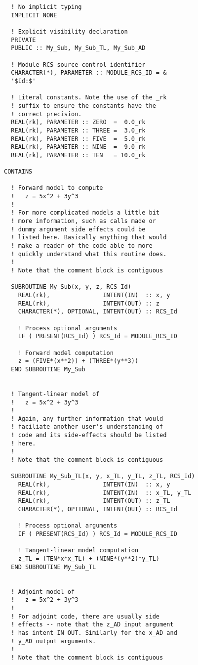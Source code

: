 \begin{appendix}
\begin{verbatim}
  ! No implicit typing
  IMPLICIT NONE

  ! Explicit visibility declaration
  PRIVATE
  PUBLIC :: My_Sub, My_Sub_TL, My_Sub_AD

  ! Module RCS source control identifier
  CHARACTER(*), PARAMETER :: MODULE_RCS_ID = &
  '$Id:$'

  ! Literal constants. Note the use of the _rk
  ! suffix to ensure the constants have the
  ! correct precision.
  REAL(rk), PARAMETER :: ZERO  =  0.0_rk
  REAL(rk), PARAMETER :: THREE =  3.0_rk
  REAL(rk), PARAMETER :: FIVE  =  5.0_rk
  REAL(rk), PARAMETER :: NINE  =  9.0_rk
  REAL(rk), PARAMETER :: TEN   = 10.0_rk

CONTAINS

  ! Forward model to compute
  !   z = 5x^2 + 3y^3
  !
  ! For more complicated models a little bit
  ! more information, such as calls made or
  ! dummy argument side effects could be 
  ! listed here. Basically anything that would
  ! make a reader of the code able to more
  ! quickly understand what this routine does.
  !
  ! Note that the comment block is contiguous

  SUBROUTINE My_Sub(x, y, z, RCS_Id)
    REAL(rk),               INTENT(IN)  :: x, y
    REAL(rk),               INTENT(OUT) :: z
    CHARACTER(*), OPTIONAL, INTENT(OUT) :: RCS_Id

    ! Process optional arguments
    IF ( PRESENT(RCS_Id) ) RCS_Id = MODULE_RCS_ID

    ! Forward model computation
    z = (FIVE*(x**2)) + (THREE*(y**3))
  END SUBROUTINE My_Sub


  ! Tangent-linear model of
  !   z = 5x^2 + 3y^3
  !
  ! Again, any further information that would
  ! faciliate another user's understanding of
  ! code and its side-effects should be listed
  ! here.
  !
  ! Note that the comment block is contiguous

  SUBROUTINE My_Sub_TL(x, y, x_TL, y_TL, z_TL, RCS_Id)
    REAL(rk),               INTENT(IN)  :: x, y
    REAL(rk),               INTENT(IN)  :: x_TL, y_TL
    REAL(rk),               INTENT(OUT) :: z_TL
    CHARACTER(*), OPTIONAL, INTENT(OUT) :: RCS_Id

    ! Process optional arguments
    IF ( PRESENT(RCS_Id) ) RCS_Id = MODULE_RCS_ID

    ! Tangent-linear model computation
    z_TL = (TEN*x*x_TL) + (NINE*(y**2)*y_TL)
  END SUBROUTINE My_Sub_TL


  ! Adjoint model of
  !   z = 5x^2 + 3y^3
  !
  ! For adjoint code, there are usually side
  ! effects -- note that the z_AD input argument
  ! has intent IN OUT. Similarly for the x_AD and
  ! y_AD output arguments.
  !
  ! Note that the comment block is contiguous


\end{verbatim}
\end{appendix}
